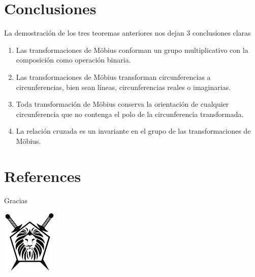 \documentclass{beamer}
\begin{document}
\section{Conclusiones}

\begin{frame}
    La demostración de los tres teoremas anteriores nos dejan 3 conclusiones claras
    \begin{enumerate}
        \item Las transformaciones de Möbius conforman un grupo multiplicativo con la composición como operación binaria.
        \item Las transformaciones de Möbius transforman circunferencias a circunferencias, bien sean líneas, circunferencias reales o imaginarias.
        \item Toda transformación de Möbius conserva la orientación de cualquier circunferencia que no contenga el polo de la circunferencia transformada.
        \item La relación cruzada es un invariante en el grupo de las transformaciones de Möbius.
    \end{enumerate}
\end{frame}

\section{References}
\begin{frame}[allowframebreaks]
    
    
    \nocite{*} %
\end{frame}

\begin{frame}
    \begin{center}
        {\Huge\calligra Gracias}
        \begin{center}
            \includegraphics[width=0.2\textwidth]{pic/logo.png}
        \end{center}
    \end{center}
\end{frame}
\end{document}
